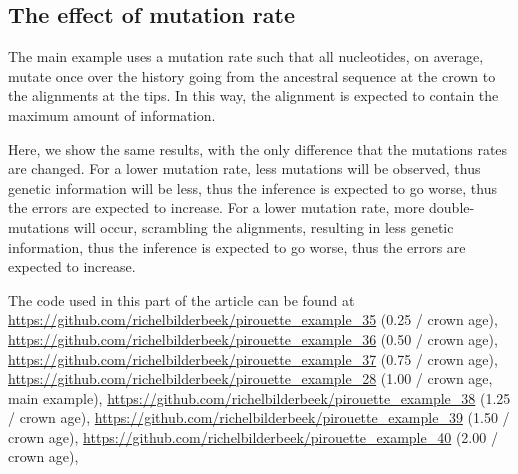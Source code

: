 \subsection{The effect of mutation rate}
\label{subsec:mutation_rate}

The main example uses a mutation rate such that all nucleotides,
on average, mutate once over the history going from the
ancestral sequence at the crown to the alignments at the tips.
In this way, the alignment is expected to contain the maximum
amount of information.

Here, we show the same results, with the only difference that
the mutations rates are changed.
For a lower mutation rate, less mutations will be observed, thus
genetic information will be less, thus the inference is expected
to go worse, thus the errors are expected to increase.
For a lower mutation rate, more double-mutations will occur,
scrambling the alignments, resulting in less genetic information, 
thus the inference is expected to go worse, 
thus the errors are expected to increase.

The code used in this part of the article can be found at 
\url{https://github.com/richelbilderbeek/pirouette_example_35} (0.25 / crown age),
\url{https://github.com/richelbilderbeek/pirouette_example_36} (0.50 / crown age),
\url{https://github.com/richelbilderbeek/pirouette_example_37} (0.75 / crown age),
\url{https://github.com/richelbilderbeek/pirouette_example_28} (1.00 / crown age, main example),
\url{https://github.com/richelbilderbeek/pirouette_example_38} (1.25 / crown age),
\url{https://github.com/richelbilderbeek/pirouette_example_39} (1.50 / crown age),
\url{https://github.com/richelbilderbeek/pirouette_example_40} (2.00 / crown age),

